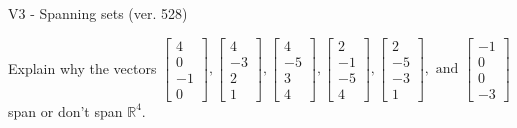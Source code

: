 \begin{exercise}
  \begin{exerciseTitle}V3 - Spanning sets (ver. 528)\end{exerciseTitle}
  \begin{exerciseStatement}
    Explain why the vectors \(\left[\begin{array}{r}
4 \\
0 \\
-1 \\
0
\end{array}\right] , \left[\begin{array}{r}
4 \\
-3 \\
2 \\
1
\end{array}\right] , \left[\begin{array}{r}
4 \\
-5 \\
3 \\
4
\end{array}\right] , \left[\begin{array}{r}
2 \\
-1 \\
-5 \\
4
\end{array}\right] , \left[\begin{array}{r}
2 \\
-5 \\
-3 \\
1
\end{array}\right] , \text{ and } \left[\begin{array}{r}
-1 \\
0 \\
0 \\
-3
\end{array}\right]\) span or don't span \(\mathbb{R}^4\). 
	



\end{exerciseStatement}
\end{exercise}
